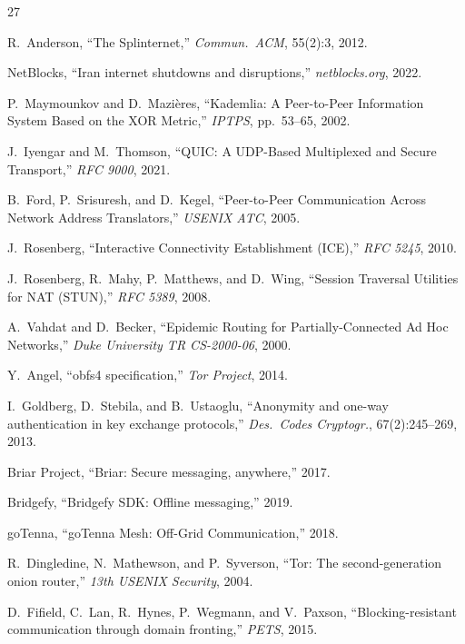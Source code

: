 \documentclass[11pt,a4paper]{article}
\begin{document}

\begin{thebibliography}{27}

R.~Anderson,
``The Splinternet,''
\emph{Commun.\ ACM}, 55(2):3, 2012.

NetBlocks,
``Iran internet shutdowns and disruptions,''
\emph{netblocks.org}, 2022.

P.~Maymounkov and D.~Mazi\`eres,
``Kademlia: A Peer-to-Peer Information System Based on the XOR Metric,''
\emph{IPTPS}, pp.~53--65, 2002.

J.~Iyengar and M.~Thomson,
``QUIC: A UDP-Based Multiplexed and Secure Transport,''
\emph{RFC 9000}, 2021.

B.~Ford, P.~Srisuresh, and D.~Kegel,
``Peer-to-Peer Communication Across Network Address Translators,''
\emph{USENIX ATC}, 2005.

J.~Rosenberg,
``Interactive Connectivity Establishment (ICE),''
\emph{RFC 5245}, 2010.

J.~Rosenberg, R.~Mahy, P.~Matthews, and D.~Wing,
``Session Traversal Utilities for NAT (STUN),''
\emph{RFC 5389}, 2008.

A.~Vahdat and D.~Becker,
``Epidemic Routing for Partially-Connected Ad Hoc Networks,''
\emph{Duke University TR CS-2000-06}, 2000.

Y.~Angel,
``obfs4 specification,''
\emph{Tor Project}, 2014.

I.~Goldberg, D.~Stebila, and B.~Ustaoglu,
``Anonymity and one-way authentication in key exchange protocols,''
\emph{Des.\ Codes Cryptogr.}, 67(2):245--269, 2013.

Briar Project,
``Briar: Secure messaging, anywhere,''
2017.

Bridgefy,
``Bridgefy SDK: Offline messaging,''
2019.

goTenna,
``goTenna Mesh: Off-Grid Communication,''
2018.

R.~Dingledine, N.~Mathewson, and P.~Syverson,
``Tor: The second-generation onion router,''
\emph{13th USENIX Security}, 2004.

D.~Fifield, C.~Lan, R.~Hynes, P.~Wegmann, and V.~Paxson,
``Blocking-resistant communication through domain fronting,''
\emph{PETS}, 2015.


\end{thebibliography}
\end{document}
